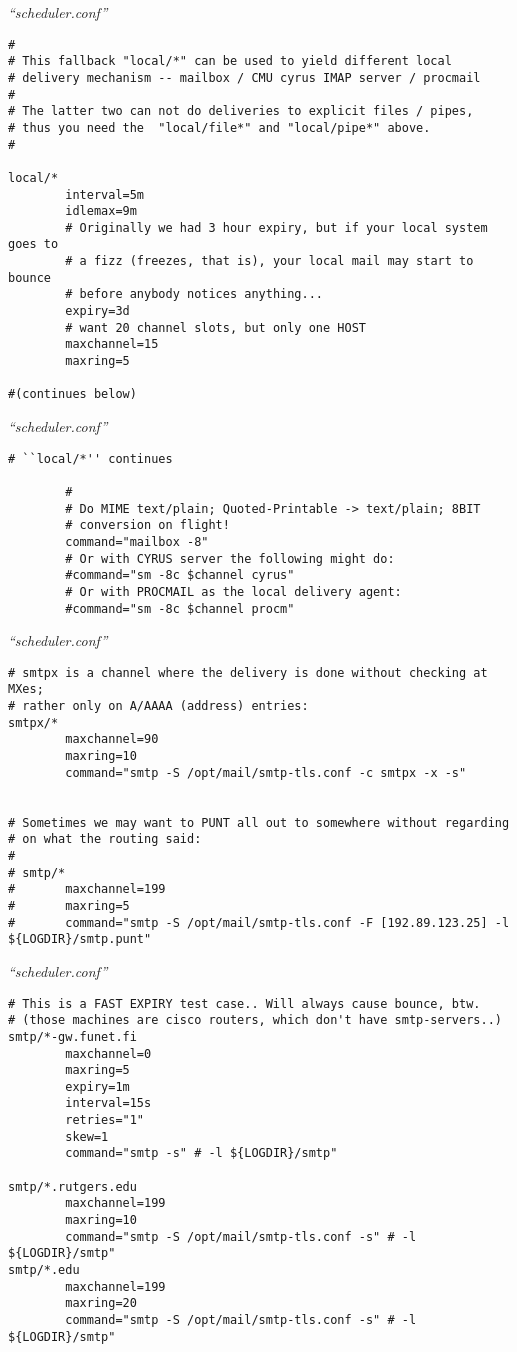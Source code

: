 \documentclass[a4paper,landscape]{slides}
\begin{document}
\begin{overlay}
\small
\centerline{{\em ``scheduler.conf''}}
\tiny
\begin{verbatim}
#
# This fallback "local/*" can be used to yield different local
# delivery mechanism -- mailbox / CMU cyrus IMAP server / procmail
#
# The latter two can not do deliveries to explicit files / pipes,
# thus you need the  "local/file*" and "local/pipe*" above.
#

local/*
        interval=5m
        idlemax=9m
        # Originally we had 3 hour expiry, but if your local system goes to
        # a fizz (freezes, that is), your local mail may start to bounce
        # before anybody notices anything...
        expiry=3d
        # want 20 channel slots, but only one HOST
        maxchannel=15
        maxring=5

#(continues below)
\end{verbatim}
\vfill
\end{overlay}
\begin{overlay}
\small
\centerline{{\em ``scheduler.conf''}}
\tiny
\begin{verbatim}
# ``local/*'' continues

        #
        # Do MIME text/plain; Quoted-Printable -> text/plain; 8BIT
        # conversion on flight!
        command="mailbox -8"
        # Or with CYRUS server the following might do:
        #command="sm -8c $channel cyrus"
        # Or with PROCMAIL as the local delivery agent:
        #command="sm -8c $channel procm"
\end{verbatim}
\vfill
\end{overlay}
\begin{overlay}
\small
\centerline{{\em ``scheduler.conf''}}
\tiny
\begin{verbatim}
# smtpx is a channel where the delivery is done without checking at MXes;
# rather only on A/AAAA (address) entries:
smtpx/*
        maxchannel=90
        maxring=10
        command="smtp -S /opt/mail/smtp-tls.conf -c smtpx -x -s"


# Sometimes we may want to PUNT all out to somewhere without regarding
# on what the routing said:
#
# smtp/*
#       maxchannel=199
#       maxring=5
#       command="smtp -S /opt/mail/smtp-tls.conf -F [192.89.123.25] -l ${LOGDIR}/smtp.punt"
\end{verbatim}
\vfill
\end{overlay}
\begin{overlay}
\small
\centerline{{\em ``scheduler.conf''}}
\tiny
\begin{verbatim}
# This is a FAST EXPIRY test case.. Will always cause bounce, btw.
# (those machines are cisco routers, which don't have smtp-servers..)
smtp/*-gw.funet.fi
        maxchannel=0
        maxring=5
        expiry=1m
        interval=15s
        retries="1"
        skew=1
        command="smtp -s" # -l ${LOGDIR}/smtp"

smtp/*.rutgers.edu
        maxchannel=199
        maxring=10
        command="smtp -S /opt/mail/smtp-tls.conf -s" # -l ${LOGDIR}/smtp"
smtp/*.edu
        maxchannel=199
        maxring=20
        command="smtp -S /opt/mail/smtp-tls.conf -s" # -l ${LOGDIR}/smtp"
\end{verbatim}
\vfill
\end{overlay}
\end{document}
